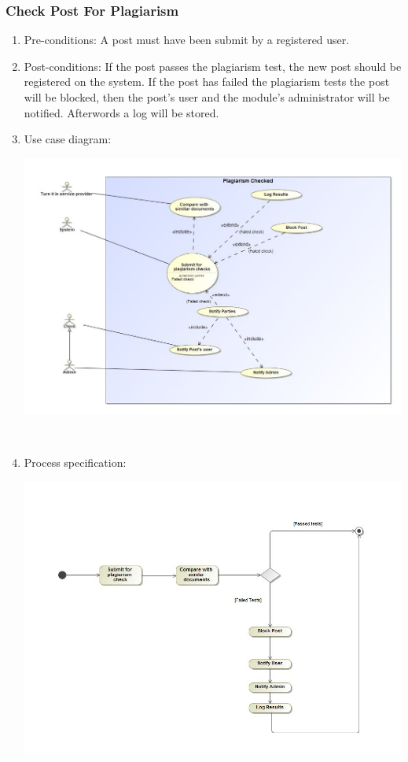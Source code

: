\documentclass[hidelinks, 12pt, oneside]{article}
\begin{document}
\subsubsection{Check Post For Plagiarism}
\begin{enumerate}
 \item Pre-conditions: A post must have been submit by a registered user. 
 
 \item Post-conditions: If the post passes the plagiarism test, the new post should be registered on the system. If the post has failed the plagiarism tests the post will be blocked, then the post's user and the module's administrator will be notified. Afterwords a log will be stored. 

 \item Use case diagram:\\
  \centerline{\includegraphics[scale=0.4]{plagiarismCheckUC}}\\
   \item Process specification:\\
 \centerline{\includegraphics[scale=0.35]{plagiarismCheckAD}} 
\end{enumerate}
\end{document}
